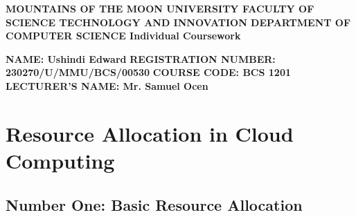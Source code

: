 \documentclass[a4paper,11pt,center]{article}
\begin{document}
	
	
	\begin{center}
		\textbf{MOUNTAINS OF THE MOON UNIVERSITY\newline\newline\newline
			FACULTY OF SCIENCE TECHNOLOGY\newline\newline\newline
			AND INNOVATION\newline\newline\newline
			DEPARTMENT OF COMPUTER SCIENCE\newline\newline\newline
			Individual Coursework}\newline\newline\newline
	\end{center}
	
	
	
	\textbf{NAME: Ushindi Edward}\newline\newline
	\textbf{REGISTRATION NUMBER: 230270/U/MMU/BCS/00530}\newline\newline
	\textbf{COURSE CODE: BCS 1201}\newline\newline
	\textbf{LECTURER'S NAME: Mr. Samuel Ocen}
	
	
	
	
	
	
	\newpage
	
	
	\section{Resource Allocation in Cloud 
		Computing}
	\subsection{\textbf{Number One: Basic Resource Allocation}}
\end{document}

